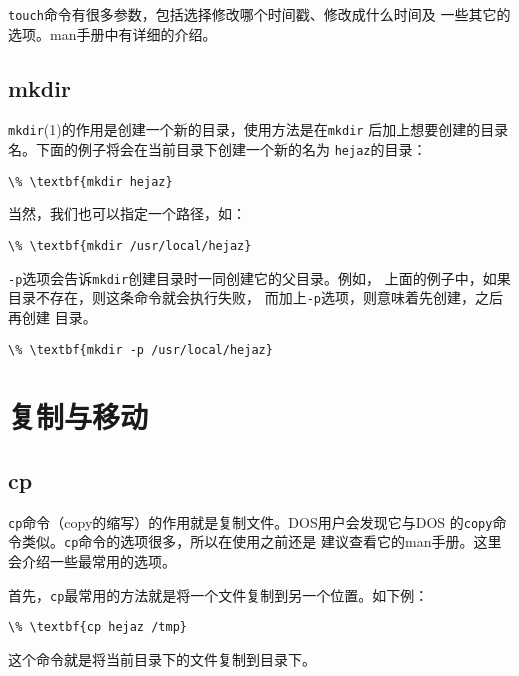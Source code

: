 \texttt{touch}命令有很多参数，包括选择修改哪个时间戳、修改成什么时间及
一些其它的选项。man手册中有详细的介绍。

\subsection{mkdir}
\label{sec:handlingFilesAndDirectories:creation:mkdir}
\texttt{mkdir}(1)的作用是创建一个新的目录，使用方法是在\texttt{mkdir}
后加上想要创建的目录名。下面的例子将会在当前目录下创建一个新的名为
\texttt{hejaz}的目录：
\begin{Verbatim}[frame=single, commandchars=\\\{\}]
\% \textbf{mkdir hejaz}
\end{Verbatim}

当然，我们也可以指定一个路径，如：
\begin{Verbatim}[frame=single, commandchars=\\\{\}]
\% \textbf{mkdir /usr/local/hejaz}
\end{Verbatim}

\texttt{-p}选项会告诉\texttt{mkdir}创建目录时一同创建它的父目录。例如，
上面的例子中，如果目录不存在，则这条命令就会执行失败，
而加上\texttt{-p}选项，则意味着先创建，之后再创建
目录。
\begin{Verbatim}[frame=single, commandchars=\\\{\}]
\% \textbf{mkdir -p /usr/local/hejaz}
\end{Verbatim}

\section{复制与移动}
\label{sec:handlingFilesAndDirectories:copyAndMove}

\subsection{cp}
\label{sec:handlingFilesAndDirectories:copyAndMove:cp}
\texttt{cp}命令（copy的缩写）的作用就是复制文件。DOS用户会发现它与DOS
的\texttt{copy}命令类似。\texttt{cp}命令的选项很多，所以在使用之前还是
建议查看它的man手册。这里会介绍一些最常用的选项。

首先，\texttt{cp}最常用的方法就是将一个文件复制到另一个位置。如下例：
\begin{Verbatim}[frame=single, commandchars=\\\{\}]
\% \textbf{cp hejaz /tmp}
\end{Verbatim}
这个命令就是将当前目录下的文件复制到目录下。

